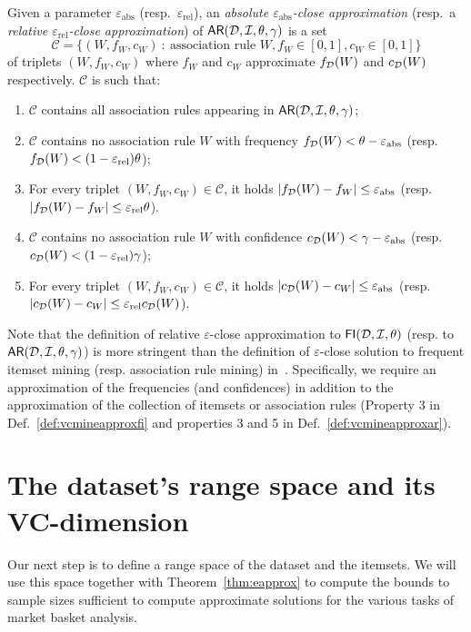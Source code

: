 \begin{definition}\label{def:vcmineapproxar} Given a parameter
  $\varepsilon_{\mathrm{abs}}$ (resp.~$\varepsilon_{\mathrm{rel}}$), an
  \emph{absolute $\varepsilon_{\mathrm{abs}}$-close approximation}  (resp.~a
  \emph{relative $\varepsilon_{\mathrm{rel}}$-close approximation}) of
  $\mathsf{AR}({\cal D},{\cal I},\theta,\gamma)$ is a set 
  \[
  \mathcal{C}=\{(W, f_W, c_W) ~:~
  \mbox{association rule } W, f_W\in[0,1], c_W\in[0,1]\}\]
  of triplets $(W, f_W, c_W)$ where $f_W$ and $c_W$ approximate $f_{\cal D}(W)$ and $c_{\cal D}(W)$
  respectively. $\mathcal{C}$ is such that:
  \begin{enumerate} 
      \item
      $\mathcal{C}$ contains all association rules appearing in
      $\mathsf{AR}({\cal D},{\cal I},\theta,\gamma)$; \item $\mathcal{C}$ contains no association
      rule $W$ with frequency $f_{\cal D}(W)<\theta-\varepsilon_{\mathrm{abs}}$
      (resp. $f_{\cal D}(W)< (1-\varepsilon_{\mathrm{rel}})\theta$);
    \item For every triplet $(W, f_W, c_W)\in\mathcal{C}$, it holds
      $|f_{\cal D}(W)-f_W|\le\varepsilon_\mathrm{abs}$ (resp.
      $|f_{\cal D}(W)-f_W|\le\varepsilon_\mathrm{rel}\theta$).
    \item $\mathcal{C}$ contains no association rule $W$ with confidence
      $c_{\cal D}(W)<\gamma-\varepsilon_{\mathrm{abs}}$ (resp. $c_{\cal D}(W)<
      (1-\varepsilon_{\mathrm{rel}})\gamma$);
    \item For every triplet $(W, f_W, c_W)\in\mathcal{C}$, it holds
      $|c_{\cal D}(W)-c_W|\le\varepsilon_\mathrm{abs}$ (resp.
      $|c_{\cal D}(W)-c_W|\le\varepsilon_\mathrm{rel}c_{\cal D}(W)$).
  \end{enumerate}
\end{definition}

Note that the definition of relative $\varepsilon$-close approximation to
$\mathsf{FI}({\cal D},{\cal I},\theta)$ (resp. to $\mathsf{AR}({\cal D},{\cal I},\theta,\gamma)$) is more
stringent than the definition of $\varepsilon$-close solution to frequent
itemset mining (resp. association rule mining)
in~\cite[Sect.~3]{ChakaravarthyPS09}. Specifically, we require an approximation
of the frequencies (and confidences) in addition to the approximation of
the collection of itemsets or association rules (Property 3 in Def.~\ref{def:vcmineapproxfi} and properties
3 and 5 in Def.~\ref{def:vcmineapproxar}).

\section{The dataset's range space and its VC-dimension}\label{sec:vcminevcdimar}
Our next step is to define a range space of the dataset and the itemsets. We
will use this space together with Theorem~\ref{thm:eapprox} to compute the bounds to
sample sizes sufficient to compute approximate solutions for the various tasks
of market basket analysis. 

